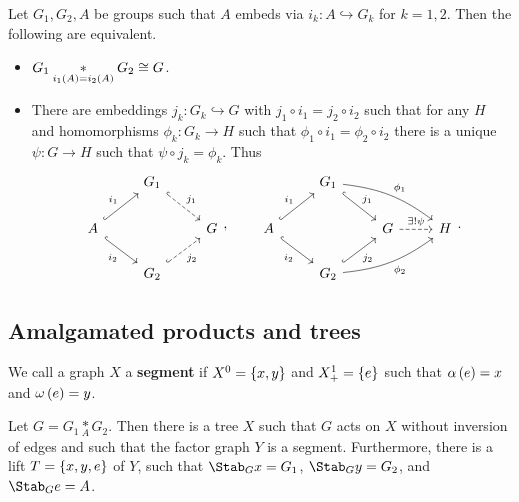 \pagebreak

\begin{fact}
Let $ G_1, G_2, A $ be groups such that $ A $ embeds via $ i_k : A \hookrightarrow G_k $ for $ k = 1, 2 $. Then the following are equivalent.
\begin{itemize}
\item $ G_1 \underset{i_1\br{A} = i_2\br{A}}{*} G_2 \cong G $.
\item There are embeddings $ j_k : G_k \hookrightarrow G $ with $ j_1 \circ i_1 = j_2 \circ i_2 $ such that for any $ H $ and homomorphisms $ \phi_k : G_k \to H $ such that $ \phi_1 \circ i_1 = \phi_2 \circ i_2 $ there is a unique $ \psi : G \to H $ such that $ \psi \circ j_k = \phi_k $. Thus
$$
\begin{tikzcd}
& G_1 \arrow[dashed, hookrightarrow]{dr}{j_1} & \\
A \arrow[hookrightarrow]{ur}{i_1} \arrow[hookrightarrow, swap]{dr}{i_2} & & G \\
& G_2 \arrow[dashed, hookrightarrow, swap]{ur}{j_2} &
\end{tikzcd},
\qquad
\begin{tikzcd}
& G_1 \arrow[hookrightarrow]{dr}{j_1} \arrow[bend left=15]{drr}{\phi_1} & & \\
A \arrow[hookrightarrow]{ur}{i_1} \arrow[hookrightarrow, swap]{dr}{i_2} & & G \arrow[dashed]{r}{\exists !\psi} & H \\
& G_2 \arrow[hookrightarrow, swap]{ur}{j_2} \arrow[bend right=15, swap]{urr}{\phi_2} & &
\end{tikzcd}.
$$
\end{itemize}
\end{fact}

\subsection{Amalgamated products and trees}

\begin{definition}
We call a graph $ X $ a \textbf{segment} if $ X^0 = \cbr{x, y} $ and $ X_+^1 = \cbr{e} $ such that $ \alpha\br{e} = x $ and $ \omega\br{e} = y $.
\end{definition}

\begin{theorem}
\label{thm:3.3.2}
Let $ G = G_1 \underset{A}{*} G_2 $. Then there is a tree $ X $ such that $ G $ acts on $ X $ without inversion of edges and such that the factor graph $ Y $ is a segment. Furthermore, there is a lift $ T = \cbr{x, y, e} $ of $ Y $, such that $ \Stab_G x = G_1 $, $ \Stab_G y = G_2 $, and $ \Stab_G e = A $.
\end{theorem}


